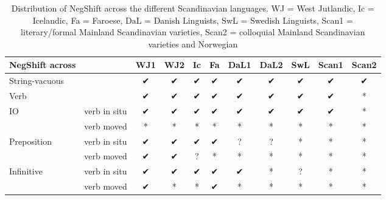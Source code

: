 \documentclass[12pt, letterpaper]{article}
\begin{document}
\begin{table}[!ht]
	\centering
	\label{tab:Distribution}
	\caption{Distribution of NegShift across the different Scandinavian languages. WJ = West Jutlandic, Ic = Icelandic, Fa = Faroese, DaL = Danish Linguists, SwL = Swedish Linguists, Scan1 = literary/formal Mainland Scandinavian varieties, Scan2 = colloquial Mainland Scandinavian varieties and Norwegian}
\begin{tabular}{llccccccccc}
	\hline 
	NegShift across &  & WJ1 & WJ2 & Ic & Fa & DaL1 & DaL2 & SwL & Scan1 & Scan2 \\ 
	\hline 
	String-vacuous &  & ✔︎ & ✔︎ & ✔︎ & ✔︎ & ✔︎ & ✔︎ & ✔︎ & ✔︎ & ✔︎ \\ 
	Verb &  & ✔︎ & ✔︎ & ✔︎ & ✔︎ & ✔︎ & ✔︎ & ✔︎ & ✔︎ & * \\ 
	IO & verb in situ & ✔︎ & ✔︎ & ✔︎ & ✔︎ & ✔︎ & ✔︎ & ✔︎ & ✔︎ & * \\ 
	& verb moved & * & * & * & * & * & * & * & * & * \\ 
	Preposition & verb in situ & ✔︎ & ✔︎ & ✔︎ & ✔︎ & ? & ? & * & * & * \\ 
	& verb moved & ✔︎ & ✔︎ & ? & * & * & * & * & * & * \\ 
	Infinitive & verb in situ & ✔︎ & ✔︎ & ✔︎ & ✔︎ & ✔︎ & * & ? & * & * \\ 
	& verb moved & ✔︎ & * & * & ✔︎ & * & * & * & * & * \\ 
	\hline 
\end{tabular} 
\end{table}
\z



\end{document}
